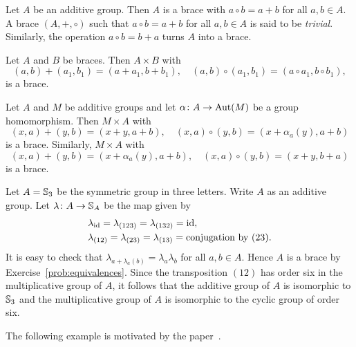 \begin{example}
	\label{exa:trivial}
	Let $A$ be an additive group. Then $A$ is a brace with
	$a\circ b=a+b$ for all $a,b\in A$. 
	A brace $(A,+,\circ)$ such that $a\circ b=a+b$ for all $a,b\in A$ is
    said to be \emph{trivial}. 
	Similarly, the
   operation $a\circ b=b+a$ turns $A$ into a brace. 
\end{example}

\begin{example}
	\label{exa:times}
	Let $A$ and $B$ be braces. Then $A\times B$ with 
	\[
		(a,b)+(a_1,b_1)=(a+a_1,b+b_1),\quad
		(a,b)\circ (a_1,b_1)=(a\circ a_1,b\circ b_1),
	\]
	is a brace. 
\end{example}

\begin{example}
	\label{exa:sd}
	Let $A$ and $M$ be additive groups and let $\alpha\colon A\to\operatorname{Aut}(M)$ be a
	group homomorphism. Then $M\times A$ with 
	\[
	(x,a)+(y,b)=(x+y,a+b),
	\quad
	(x,a)\circ (y,b)=(x+\alpha_a(y),a+b)
	\]
	is a brace. Similarly, $M\times A$ with
	\[
	(x,a)+(y,b)=(x+\alpha_a(y),a+b),\quad
	(x,a)\circ (y,b)=(x+y,b+a)
	\]
	is a brace. 
\end{example}

\begin{example}
  \label{exa:s3c6}
  Let $A=\mathbb{S}_3$ be the symmetric group in three letters. Write $A$ as an additive group. 
  Let $\lambda\colon A\to\mathbb{S}_A$ 
  be the map given by
  \begin{align*}
    &\lambda_{\operatorname{id}}=\lambda_{(123)}=\lambda_{(132)}=\operatorname{id},\\
    &\lambda_{(12)}=\lambda_{(23)}=\lambda_{(13)}=\text{conjugation by $(23)$}.
  \end{align*}
  It is easy to check that $\lambda_{a+\lambda_a(b)}=\lambda_a\lambda_b$
  for all $a,b\in A$. Hence $A$ is a brace by Exercise~\ref{prob:equivalences}. 
  Since the transposition $(12)$ has order
  six in the multiplicative group of $A$, it follows that the additive group of $A$ is isomorphic to $\mathbb{S}_3$ and
  the multiplicative group of $A$ is isomorphic to the cyclic group of order six. 
\end{example}

The following example is motivated by the paper~\cite{MR1178147}.

